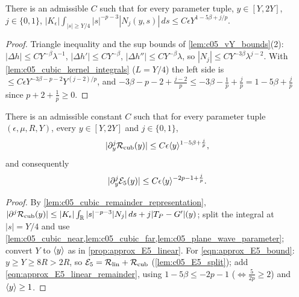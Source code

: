 \begin{lemma}
  \label{lem:c05_cubic_far}
  There is an admissible $C$ such that for every parameter tuple, $y\in[Y,2Y]$, $j\in\{0,1\}$,
  $|K_\epsilon|\int_{|s|\ge Y/4}|s|^{-p-3}|N_j(y,s)|\,ds\le C\epsilon Y^{1-5\beta+j/p}$.
\end{lemma}
\begin{proof}
  Triangle inequality and the sup bounds of \cref{lem:c05_vY_bounds}(2): $|\Delta h|\le CY^{-\beta}\lambda^{-1}$, $|\Delta h'|\le CY^{-\beta}$,
  $|\Delta h''|\le CY^{-\beta}\lambda$, so $|N_j|\le CY^{-3\beta}\lambda^{j-2}$. With \cref{lem:c05_cubic_kernel_integrals} ($L=Y/4$) the
  left side is $\le C\epsilon Y^{-3\beta-p-2}Y^{(j-2)/p}$, and $-3\beta-p-2+\frac{j-2}p\le-3\beta-\frac1p+\frac jp=1-5\beta+\frac jp$ since
  $p+2+\frac1p\ge0$.
\end{proof}

\begin{proposition}
  \label{prop:approx_E5_cubic}
  There is an admissible constant $C$ such that for every parameter tuple $(\epsilon,\mu,R,Y)$, every $y\in[Y,2Y]$ and $j\in\{0,1\}$,
  \begin{equation}\label{eqn:approx_E5_cubic_remainder}
    |\partial_y^j\mathcal{R}_{\textup{cub}}(y)|\le C\epsilon\langle y \rangle^{1-5\beta+\frac jp},
  \end{equation}
  and consequently
  \begin{equation}\label{eqn:approx_E5_bound}
    |\partial_y^j\mathcal{E}_5(y)|\le C\epsilon\langle y \rangle^{-2p-1+\frac jp}.
  \end{equation}
\end{proposition}
\begin{proof}
  By \cref{lem:c05_cubic_remainder_representation}, $|\partial^j\mathcal{R}_{\textup{cub}}(y)|\le|K_\epsilon|\int_{\mathbb{R}}|s|^{-p-3}|N_j|\,ds+j|T_P-G'|(y)$;
  split the integral at $|s|=Y/4$ and use \cref{lem:c05_cubic_near,lem:c05_cubic_far,lem:c05_plane_wave_parameter}; convert $Y$ to
  $\langle y \rangle$ as in \cref{prop:approx_E5_linear}. For \eqref{eqn:approx_E5_bound}: $y\ge Y\ge8R>2R$, so
  $\mathcal{E}_5=\mathcal{R}_{\textup{lin}}+\mathcal{R}_{\textup{cub}}$ (\cref{lem:c05_E5_split}); add \eqref{eqn:approx_E5_linear_remainder}, using
  $1-5\beta\le-2p-1$ ($\Leftrightarrow\frac5{2p}\ge2$) and $\langle y \rangle\ge1$.
\end{proof}
